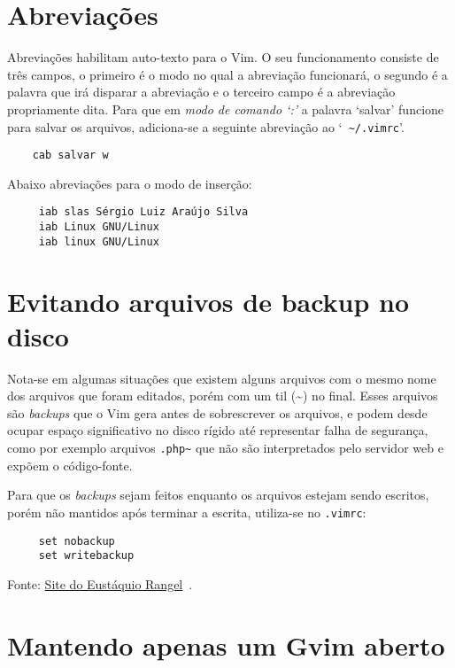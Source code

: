 \section{Abreviações}\label{Abreviações}

Abreviações habilitam auto-texto para o Vim. O seu funcionamento consiste de
três campos, o primeiro é o modo no qual a abreviação funcionará, o segundo é a
palavra que irá disparar a abreviação e o terceiro campo é a abreviação
propriamente dita. Para que em {\em modo de comando `:'} a palavra `salvar'
funcione para salvar os arquivos, adiciona-se a seguinte abreviação ao `{\tt
\textasciitilde/.vimrc}'. 

\begin{verbatim}
    cab salvar w
\end{verbatim}

Abaixo abreviações para o modo de inserção:

\begin{verbatim}
     iab slas Sérgio Luiz Araújo Silva
     iab Linux GNU/Linux
     iab linux GNU/Linux
\end{verbatim}

\section{Evitando arquivos de backup no disco}
\label{Evitando arquivos de backup no disco}

Nota-se em algumas situações que existem alguns arquivos com o mesmo nome dos
arquivos que foram editados, porém com um til (\textasciitilde) no final. Esses
arquivos são {\em backups} que o Vim gera antes de sobrescrever os arquivos, e
podem desde ocupar espaço significativo no disco rígido até representar falha
de segurança, como por exemplo arquivos {\tt .php\textasciitilde} que não são
interpretados pelo servidor web e expõem o código-fonte.

Para que os {\em backups} sejam feitos enquanto os arquivos estejam sendo escritos, porém não 
mantidos após terminar a escrita, utiliza-se no \verb|.vimrc|:

\begin{verbatim}
     set nobackup
     set writebackup
\end{verbatim}

Fonte: \href{http://eustaquiorangel.com/posts/520}{Site do Eustáquio
Rangel}~\cite{SiteEustaquioRangel01}.

\section{Mantendo apenas um Gvim aberto}
\label{Mantenddo apenas um Gvim aberto}

